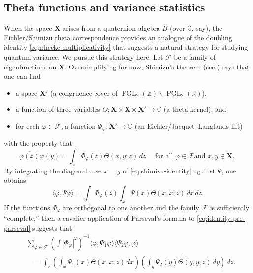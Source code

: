 \documentclass[reqno,10pt]{amsart}
\theoremstyle{plain} %
\theoremstyle{definition}
\theoremstyle{plain} %
\theoremstyle{remark}
\theoremstyle{itplain} %
\theoremstyle{remark} %
\numberwithin{equation}{section}
\def\PGL{\operatorname{PGL}}
\begin{document}
\subsection{Theta functions and variance statistics}\label{sec:theta-funct-vari}
When the space $\mathbf{X}$ arises from a quaternion algebra $B$ (over $\mathbb{Q}$, say), the Eichler/Shimizu theta correspondence provides an analogue of the doubling identity \eqref{eqn:hecke-multiplicativity} that suggests a natural strategy for studying quantum variance.  We pursue this strategy here.  Let $\mathcal{F}$ be a family of eigenfunctions on $\mathbf{X}$.  Oversimplifying for now, Shimizu's theorem (see \cite[II.1]{MR783511}) says that one can find
\begin{itemize}
\item a space $\mathbf{X} '$ (a congruence cover of $\PGL_2(\mathbb{Z}) \backslash \PGL_2(\mathbb{R})$),
\item a function of three variables $\Theta : \mathbf{X} \times \mathbf{X} \times \mathbf{X} ' \rightarrow \mathbb{C}$ (a theta kernel), and
\item for each $\varphi \in \mathcal{F}$, a function $\Phi_\varphi : \mathbf{X} ' \rightarrow \mathbb{C}$ (an Eichler/Jacquet--Langlands lift)
\end{itemize}
with the property that
\begin{equation}\label{eq:shimizu-identity}
  \overline{\varphi(x)} \varphi(y)
  =
  \int_{z}
  \Phi_\varphi(z)
  \Theta(x,y;z) \, d z
  \quad \text{ for all $\varphi \in \mathcal{F}$
    and $x,y \in \mathbf{X}$.
  }
\end{equation}
By integrating the diagonal case $x=y$ of \eqref{eq:shimizu-identity} against $\Psi$, one obtains
\begin{equation}\label{eq:identity-pre-parseval}
  \langle \varphi, \Psi \varphi  \rangle
  =
  \int_{z}
  \Phi_\varphi(z)
  \int_x \Psi(x)
  \Theta(x,x;z)  \, d x \, d z.
\end{equation}
If the functions $\Phi_\varphi$ are orthogonal to one another and the family $\mathcal{F}$ is sufficiently ``complete,'' then a cavalier application of Parseval's formula to \eqref{eq:identity-pre-parseval} suggests that
\begin{equation}\label{eq:formula-seesaw}
  \begin{split}
    &\sum_{\varphi \in \mathcal{F}}
  \left(\int |\Phi_\varphi|^2 \right)^{-1}
  \langle \varphi, \Psi_1 \varphi  \rangle
  \langle \Psi_2 \varphi, \varphi  \rangle \\
 &\quad  =
  \int_{z}
  \left(\int_x \Psi_1(x)
  \Theta(x,x;z) \, d x\right)
  \overline{\left(\int_y \Psi_2(y)
    \Theta(y,y;z) \,d y \right)} \,d z.
\end{split}
\end{equation}
\end{document}
